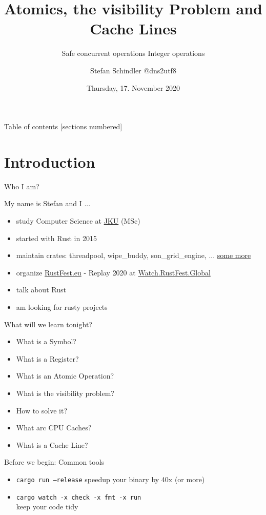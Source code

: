 \documentclass[10pt,aspectratio=169]{beamer}
\title{Atomics, the visibility Problem and Cache Lines}
\subtitle{Safe concurrent operations Integer operations}
\date{Thursday, 17. November 2020}
\author{Stefan Schindler @dns2utf8}
\institute{hosted by \href{https://rust-linz.at/}{Rust Meetup Linz}}
\begin{document}
\maketitle

\begin{frame}{Table of contents}
  [sections numbered]
  \tableofcontents[hideallsubsections]
\end{frame}

\section{Introduction}

\begin{frame}[fragile]{Who I am?}

My name is Stefan and I ...

\begin{itemize}
\item study Computer Science at \href{https://jku.at}{JKU} (MSc)
\item started with Rust in 2015
\item maintain crates: threadpool, wipe\_buddy, son\_grid\_engine, ... \href{https://crates.io/users/dns2utf8}{some more}
\item organize \href{https://rustfest.eu}{RustFest.eu} - Replay 2020 at \href{https://watch.rustfest.global/}{Watch.RustFest.Global}
\item talk about Rust
\item am looking for rusty projects
\end{itemize}

\end{frame}
\begin{frame}{What will we learn tonight?}
  
\begin{itemize}
\item What is a Symbol?
\item What is a Register?
\item What is an Atomic Operation?
\item What is the visibility problem?
\item How to solve it?
\item What arc CPU Caches?
\item What is a Cache Line?
\end{itemize}
\end{frame}

\begin{frame}{Before we begin: Common tools}
  
\begin{itemize}
\item \texttt{cargo run \alert{--release}} speedup your binary by 40x (or more)
\item \texttt{cargo watch -x \alert{check} -x \alert{fmt} -x \alert{run}} \\
      keep your code tidy
\end{itemize}
\end{frame}
\end{document}
